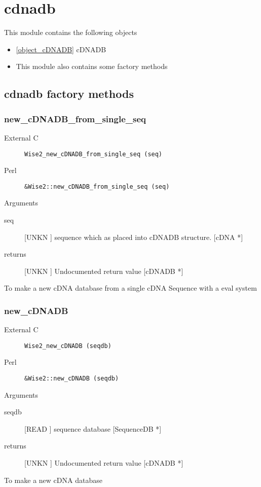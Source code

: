 \section{cdnadb}
\label{module_cdnadb}
This module contains the following objects

\begin{itemize}
\item \ref{object_cDNADB} cDNADB

\item This module also contains some factory methods
\end{itemize}
\subsection{cdnadb factory methods}
\subsubsection{new_cDNADB_from_single_seq}
\begin{description}
\item[External C] {\tt Wise2_new_cDNADB_from_single_seq (seq)}
\item[Perl] {\tt &Wise2::new_cDNADB_from_single_seq (seq)}

\end{description}
Arguments
\begin{description}
\item[seq] [UNKN ] sequence which as placed into cDNADB structure. [cDNA *]
\item[returns] [UNKN ] Undocumented return value [cDNADB *]
\end{description}
To make a new cDNA database
from a single cDNA Sequence with a eval system


\subsubsection{new_cDNADB}
\begin{description}
\item[External C] {\tt Wise2_new_cDNADB (seqdb)}
\item[Perl] {\tt &Wise2::new_cDNADB (seqdb)}

\end{description}
Arguments
\begin{description}
\item[seqdb] [READ ] sequence database [SequenceDB *]
\item[returns] [UNKN ] Undocumented return value [cDNADB *]
\end{description}
To make a new cDNA database




